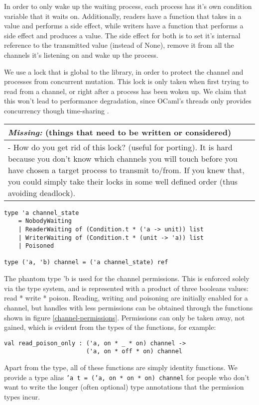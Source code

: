 \documentclass[a4paper,12pt]{article}
\newcommand{\missing}[1]{
  \begin{tabular}{|p{11cm}|}
    \hline
    \emph{Missing:} {\scriptsize (things that need to be written or considered)} \\
    \hline
    #1
    \hline
  \end{tabular}
}
\begin{document}
In order to only wake up the waiting process, each process has it's own condition variable that
it waits on. Additionally, readers have a function that takes in a value and performs a side 
effect, while writers have a function that performs a side effect and produces a value. The side
effect for both is to set it's internal reference to the transmitted value (instead of None),
remove it from all the channels it's listening on and wake up the process.

We use a lock that is global to the library, in order to protect the channel and processes from
concurrent mutation. This lock is only taken when first trying to read from a channel, or
right after a process has been woken up. We claim that this won't lead to performance degradation,
since OCaml's threads only provides concurrency though time-sharing \cite{ocaml-threads}.

\missing{
- How do you get rid of this lock? (useful for porting). It is hard because you don't know which
channels you will touch before you have chosen a target process to transmit to/from. If you knew
that, you could simply take their locks in some well defined order (thus avoiding deadlock). \\
}

\begin{verbatim}
type 'a channel_state
    = NobodyWaiting 
    | ReaderWaiting of (Condition.t * ('a -> unit)) list
    | WriterWaiting of (Condition.t * (unit -> 'a)) list
    | Poisoned

type ('a, 'b) channel = ('a channel_state) ref
\end{verbatim}

The phantom type 'b is used for the channel permissions. This is enforced solely via the type
system, and is represented with a product of three booleans values: read * write * poison.
Reading, writing and poisoning are initially enabled for a channel, but handles with less 
permissions can be obtained through the functions shown in figure \ref{channel-permissions}. 
Permissions can only be taken away, not gained, which is evident from the types of the 
functions, for example: 

\begin{verbatim}
val read_poison_only : ('a, on * _ * on) channel -> 
                       ('a, on * off * on) channel
\end{verbatim}

Apart from the type, all of these functions are simply identity functions. We provide a
type alias \texttt{'a t = ('a, on * on * on) channel} for people who don't want to write the
longer (often optional) type annotations that the permission types incur.
\end{document}
